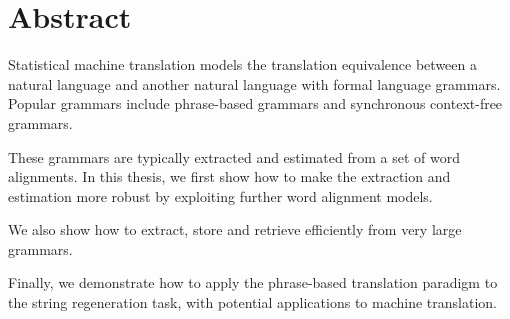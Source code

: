 \chapter*{Abstract}


Statistical machine translation models the translation equivalence
between a natural language and another natural language
with formal language grammars. Popular grammars include
phrase-based grammars and synchronous context-free
grammars.

These grammars are typically extracted and estimated from
a set of word alignments. In this thesis, we first show
how to make the extraction and estimation more robust
by exploiting further word alignment models.

We also show how to extract, store and retrieve efficiently
from very large grammars.

Finally, we demonstrate how to apply the phrase-based translation
paradigm to the string regeneration task, with potential
applications to machine translation.
